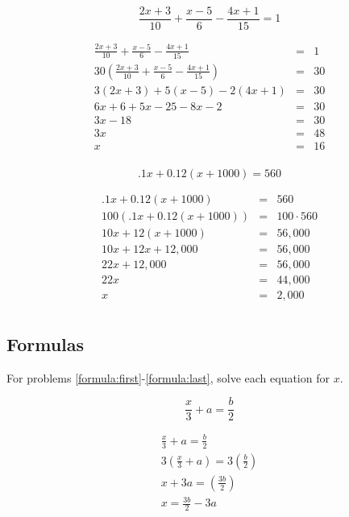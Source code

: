 \documentclass[fleqn,addpoints]{exam}
\begin{document}
\begin{questions}
\question[5]
\[ \frac{2x + 3}{10} + \frac{x - 5}{6} - \frac{4x + 1}{15} = 1 \]
\begin{solution}[4 cm]
\begin{eqnarray*}
  \frac{2x + 3}{10} + \frac{x - 5}{6} - \frac{4x + 1}{15} &=& 1  \\
  30 \left( \frac{2x + 3}{10} + \frac{x - 5}{6} - \frac{4x + 1}{15} \right) &=& 30  \\
  3(2x + 3) + 5(x - 5) - 2(4x + 1) &=& 30  \\
  6x + 6 + 5x - 25 - 8x - 2 &=& 30  \\
  3x - 18 &=& 30  \\
  3x &=& 48  \\
  x &=& 16  \\  
\end{eqnarray*}

\end{solution}

\question[5]
\label{e:last}
\[ .1x + 0.12(x + 1000) =  560 \]
\begin{solution}[4 cm]
\begin{eqnarray*}
  .1x + 0.12(x + 1000) &=&  560 \\
  100(.1x + 0.12(x + 1000)) &=&  100 \cdot 560 \\
  10x + 12(x + 1000) &=&  56,000 \\
  10x + 12x + 12,000 &=&  56,000 \\
  22x + 12,000 &=&  56,000 \\
  22x &=&  44,000 \\
  x &=&  2,000 \\
\end{eqnarray*}
\end{solution}

\subsection{Formulas}

For problems \ref{formula:first}-\ref{formula:last}, solve each equation for $x$.

\question[5]
\label{formula:first}
\[ \frac{x}{3} + a = \frac{b}{2} \]
\begin{solution}[4 cm]
\begin{eqnarray*}
  \frac{x}{3} + a = \frac{b}{2} \\
  3 \left( \frac{x}{3} + a \right) = 3 \left( \frac{b}{2} \right) \\
  x + 3a = (\frac{3b}{2}) \\
  x = \frac{3b}{2} - 3a\\
\end{eqnarray*}


\end{solution}
\end{questions}
\end{document}
